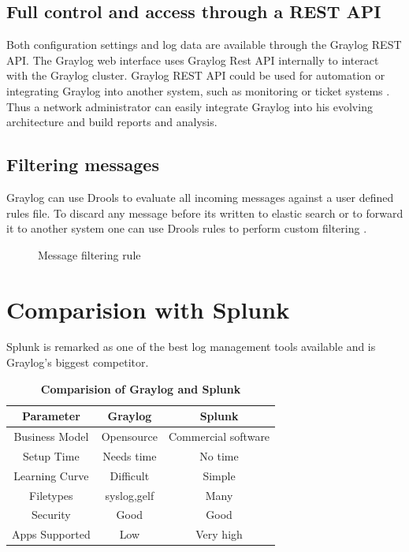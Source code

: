 \documentclass[9pt,twocolumn,twoside]{styles/osajnl}
\begin{document}
\subsection{Full control and access through a REST API}

Both configuration settings and log data are available through the
Graylog REST API.  The Graylog web interface uses Graylog Rest API
internally to interact with the Graylog cluster. Graylog REST API
could be used for automation or integrating Graylog into another
system, such as monitoring or ticket systems
\cite{www-graylog-restapi}. Thus a network administrator can easily
integrate Graylog into his evolving architecture and build reports and
analysis.

\subsection{Filtering messages}

Graylog can use Drools to evaluate all incoming messages against a
user defined rules file. To discard any message before its written to
elastic search or to forward it to another system one can use Drools
rules to perform custom filtering \cite{www-graylog-blacklisting}.

\begin{figure}[htbp]
\centering
{}
\caption{\cite{www-graylog-blacklisting} Message filtering rule }
\label{fig:Sample filtering rule}
\end{figure}


\section{Comparision with Splunk}
Splunk is remarked as one of the best log management tools available
and is Graylog's biggest competitor.
\newline
\begin{table}[htbp]
\centering
\caption{\bf Comparision of Graylog and Splunk}
\begin{tabular}{ccc}
\hline
Parameter & Graylog & Splunk \\
\hline
Business Model& Opensource & Commercial software \\
Setup Time & Needs time & No time\\
Learning Curve & Difficult & Simple\\
Filetypes & syslog,gelf & Many\\
Security & Good & Good\\
Apps Supported & Low & Very high\\
\hline
\end{tabular}
  \label{tab:shape-functions}
\end{table}
\end{document}

